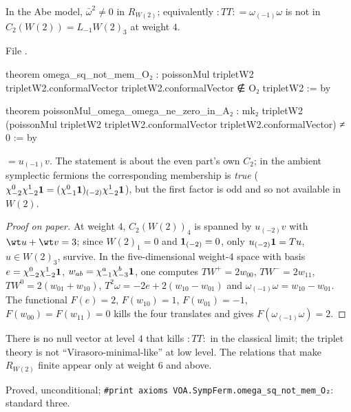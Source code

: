 \begin{theorem}\label{l18:thm:TTnull}
In the Abe model, $\bar\omega^2\ne0$ in $R_{W(2)}$; equivalently ${:}TT{:}=\omega_{(-1)}\omega$ is not in
$C_2(W(2))=L_{-1}W(2)_3$ at weight $4$.
\end{theorem}
\noindent File .
\begin{leancode}
theorem omega_sq_not_mem_O₂ :
    poissonMul tripletW2 tripletW2.conformalVector tripletW2.conformalVector
      ∉ O₂ tripletW2 := by

theorem poissonMul_omega_omega_ne_zero_in_A₂ :
    mk₂ tripletW2 (poissonMul tripletW2 tripletW2.conformalVector tripletW2.conformalVector)
      ≠ 0 := by
\end{leancode}
\begin{dictionary}
 $=u_{(-1)}v$. The statement is about the even part's own $C_2$; in the ambient
symplectic fermions the corresponding membership is \emph{true}
($\chi^0_{-2}\chi^1_{-2}\mathbf{1}=(\chi^0_{-1}\mathbf{1})_{(-2)}\chi^1_{-2}\mathbf{1}$), but the first factor is odd and so not
available in $W(2)$.
\end{dictionary}
\begin{proof}[Proof on paper]
At weight $4$, $C_2(W(2))_4$ is spanned by $u_{(-2)}v$ with $\wt u+\wt v=3$; since $W(2)_1=0$ and
$\mathbf{1}_{(-2)}=0$, only $u_{(-2)}\mathbf{1}=Tu$, $u\in W(2)_3$, survive. In the five-dimensional weight-$4$
space with basis $e=\chi^0_{-2}\chi^1_{-2}\mathbf{1}$, $w_{ab}=\chi^a_{-1}\chi^b_{-3}\mathbf{1}$, one computes
$TW^+=2w_{00}$, $TW^-=2w_{11}$, $TW^0=2(w_{01}+w_{10})$, $T^2\omega=-2e+2(w_{10}-w_{01})$ and
$\omega_{(-1)}\omega=w_{10}-w_{01}$. The functional $F(e)=2$, $F(w_{10})=1$, $F(w_{01})=-1$, $F(w_{00})=F(w_{11})=0$ kills
the four translates and gives $F(\omega_{(-1)}\omega)=2$.
\end{proof}
\begin{physics}
There is no null vector at level $4$ that kills ${:}TT{:}$ in the classical limit; the triplet theory is not
``Virasoro-minimal-like'' at low level. The relations that make $R_{W(2)}$ finite appear only at weight $6$
and above.
\end{physics}
\begin{status}
Proved, unconditional; \texttt{\#print axioms VOA.SympFerm.omega\_sq\_not\_mem\_O₂}: standard three.
\end{status}


